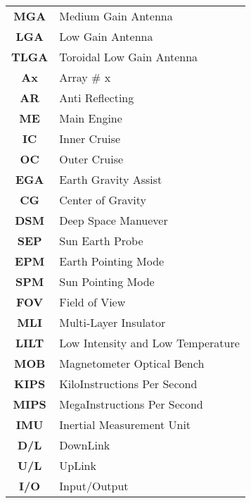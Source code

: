 \begin{multicols}{2}
{\begin{xltabular}{\linewidth}{c>{\raggedright\arraybackslash}X}
		\textbf{MGA} & Medium Gain Antenna \\
		\textbf{LGA} & Low Gain Antenna \\
		\textbf{TLGA} & Toroidal Low Gain Antenna \\
		\textbf{Ax} & Array \# x \\
		\textbf{AR} & Anti Reflecting\\
		\textbf{ME} & Main Engine \\
		\textbf{IC} & Inner Cruise \\
		\textbf{OC} & Outer Cruise \\
		\textbf{EGA} & Earth Gravity Assist\\
		\textbf{CG} & Center of Gravity \\
		\textbf{DSM} & Deep Space Manuever\\
		\textbf{SEP} & Sun Earth Probe \\
		\textbf{EPM} & Earth Pointing Mode \\
		\textbf{SPM} & Sun Pointing Mode \\
		\textbf{FOV} & Field of View \\
		\textbf{MLI} & Multi-Layer Insulator \\
		\textbf{LILT} & Low Intensity and Low Temperature \\
		\textbf{MOB} & Magnetometer Optical Bench \\
		\textbf{KIPS} & KiloInstructions Per Second \\
		\textbf{MIPS} & MegaInstructions Per Second \\
		\textbf{IMU} & Inertial Measurement Unit \\
		\textbf{D/L} & DownLink \\
		\textbf{U/L} & UpLink \\
		\textbf{I/O} & Input/Output
 	\end{xltabular}
	\unskip
	\unpenalty
	\unpenalty}
	\unvbox\ltmcbox
\end{multicols}